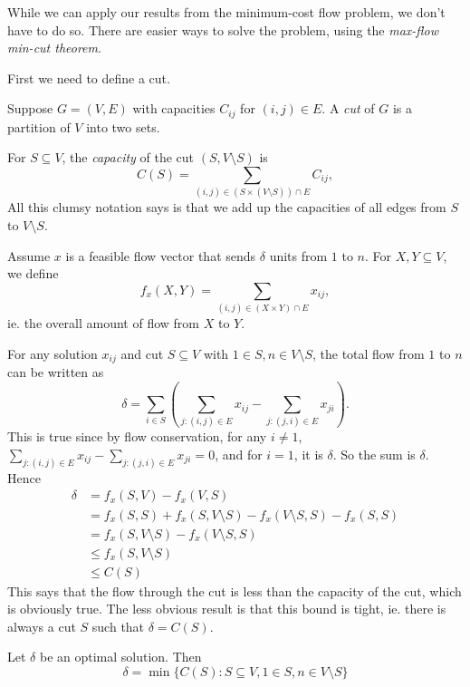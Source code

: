 \documentclass[a4paper]{article}
\begin{document}
While we can apply our results from the minimum-cost flow problem, we don't have to do so. There are easier ways to solve the problem, using the \emph{max-flow min-cut theorem}.

First we need to define a cut.
\begin{defi}[Cut]
  Suppose $G = (V, E)$ with capacities $C_{ij}$ for $(i, j)\in E$. A \emph{cut} of $G$ is a partition of $V$ into two sets.

  For $S\subseteq V$, the \emph{capacity} of the cut $(S, V\setminus S)$ is
  \[
    C(S) = \sum_{(i, j)\in (S\times (V\setminus S))\cap E}C_{ij},
  \]
  All this clumsy notation says is that we add up the capacities of all edges from $S$ to $V\setminus S$.
\end{defi}

Assume $x$ is a feasible flow vector that sends $\delta$ units from $1$ to $n$. For $X, Y\subseteq V$, we define
\[
  f_x(X, Y) = \sum_{(i, j)\in (X\times Y)\cap E}x_{ij},
\]
ie. the overall amount of flow from $X$ to $Y$.

For any solution $x_{ij}$ and cut $S\subseteq V$ with $1\in S, n\in V\setminus S$, the total flow from $1$ to $n$ can be written as
\[
  \delta = \sum_{i\in S}\left(\sum_{j: (i, j)\in E}x_{ij} - \sum_{j: (j, i)\in E}x_{ji}\right).
\]
This is true since by flow conservation, for any $i \not= 1$, $\sum\limits_{j: (i, j) \in E}x_{ij} - \sum\limits_{j: (j, i)\in E}x_{ji} = 0$, and for $i = 1$, it is $\delta$. So the sum is $\delta$. Hence
\begin{align*}
  \delta &= f_x(S, V) - f_x(V, S)\\
  &= f_x(S, S) + f_x(S, V\setminus S) - f_x(V\setminus S, S) - f_x(S, S)\\
  &= f_x(S, V\setminus S) - f_x(V\setminus S, S)\\
  &\leq f_x(S, V\setminus S)\\
  &\leq C(S)
\end{align*}
This says that the flow through the cut is less than the capacity of the cut, which is obviously true. The less obvious result is that this bound is tight, ie. there is always a cut $S$ such that $\delta = C(S)$.

\begin{thm}
  Let $\delta$ be an optimal solution. Then
  \[
    \delta = \min\{C(S): S\subseteq V, 1\in S, n \in V\setminus S\}
  \]
\end{thm}
\end{document}
